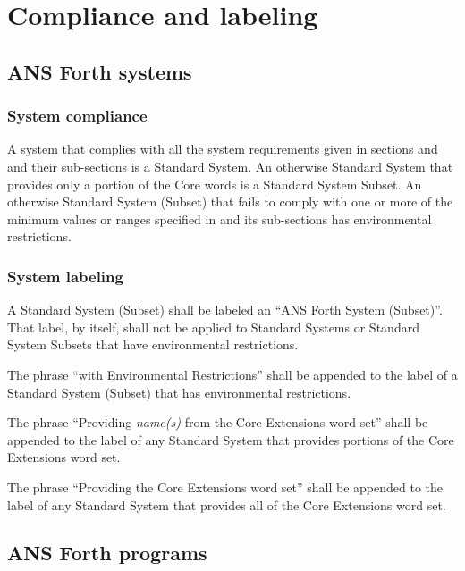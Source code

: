\chapter{Compliance and labeling}
\label{label}

\section{ANS Forth systems} %
\label{label:label}

\subsection{System compliance} %
\label{label:system}

A system that complies with all the system requirements given in
sections  and
 and their sub-sections is
a Standard System. An otherwise Standard System that provides only
a portion of the Core words is a Standard System Subset. An
otherwise Standard System (Subset) that fails to comply with one or
more of the minimum values or ranges specified in
 and its sub-sections has
environmental restrictions.

\subsection{System labeling} %

A Standard System (Subset) shall be labeled an ``ANS Forth System
(Subset)''. That label, by itself, shall not be applied to Standard
Systems or Standard System Subsets that have environmental
restrictions.

The phrase ``with Environmental Restrictions'' shall be appended to
the label of a Standard System (Subset) that has environmental
restrictions.

The phrase ``Providing \emph{name(s)} from the Core Extensions word
set'' shall be appended to the label of any Standard System that
provides portions of the Core Extensions word set.

The phrase ``Providing the Core Extensions word set'' shall be
appended to the label of any Standard System that provides all of
the Core Extensions word set.


\section{ANS Forth programs} %

